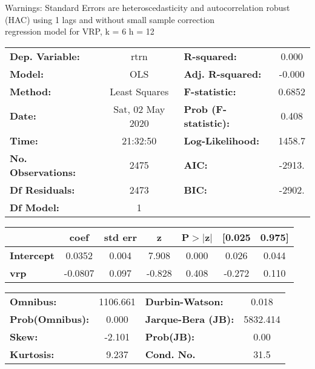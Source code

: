 Warnings: \newline
 [1] Standard Errors are heteroscedasticity and autocorrelation robust (HAC) using 1 lags and without small sample correction\\ 

regression model for VRP, k = 6 h = 12\begin{center}
\begin{tabular}{lclc}
\toprule
\textbf{Dep. Variable:}    &       rtrn       & \textbf{  R-squared:         } &     0.000   \\
\textbf{Model:}            &       OLS        & \textbf{  Adj. R-squared:    } &    -0.000   \\
\textbf{Method:}           &  Least Squares   & \textbf{  F-statistic:       } &    0.6852   \\
\textbf{Date:}             & Sat, 02 May 2020 & \textbf{  Prob (F-statistic):} &    0.408    \\
\textbf{Time:}             &     21:32:50     & \textbf{  Log-Likelihood:    } &    1458.7   \\
\textbf{No. Observations:} &        2475      & \textbf{  AIC:               } &    -2913.   \\
\textbf{Df Residuals:}     &        2473      & \textbf{  BIC:               } &    -2902.   \\
\textbf{Df Model:}         &           1      & \textbf{                     } &             \\
\bottomrule
\end{tabular}
\begin{tabular}{lcccccc}
                   & \textbf{coef} & \textbf{std err} & \textbf{z} & \textbf{P$> |$z$|$} & \textbf{[0.025} & \textbf{0.975]}  \\
\midrule
\textbf{Intercept} &       0.0352  &        0.004     &     7.908  &         0.000        &        0.026    &        0.044     \\
\textbf{vrp}       &      -0.0807  &        0.097     &    -0.828  &         0.408        &       -0.272    &        0.110     \\
\bottomrule
\end{tabular}
\begin{tabular}{lclc}
\textbf{Omnibus:}       & 1106.661 & \textbf{  Durbin-Watson:     } &    0.018  \\
\textbf{Prob(Omnibus):} &   0.000  & \textbf{  Jarque-Bera (JB):  } & 5832.414  \\
\textbf{Skew:}          &  -2.101  & \textbf{  Prob(JB):          } &     0.00  \\
\textbf{Kurtosis:}      &   9.237  & \textbf{  Cond. No.          } &     31.5  \\
\bottomrule
\end{tabular}
\end{center}

